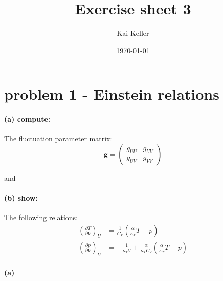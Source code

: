 \documentclass[a4paper]{article}
\title{Exercise sheet 3}
\author{Kai Keller}
\date{\today}
\newcommand{\pd}[3]{\left(\frac{\partial {#1}}{\partial {#2}}\right)_{#3}}
\begin{document}
\maketitle
\tableofcontents

\section{problem 1 - Einstein relations}
\paragraph{(a) compute:}
The fluctuation parameter matrix:
\begin{equation}
    \mathbf{g}=
    \begin{pmatrix}
        g_{UU} & g_{UV} \\
        g_{UV} & g_{VV}
    \end{pmatrix}
\end{equation}

and
\paragraph{(b) show:}
The following relations:
\begin{align}
    \pd{T}{V}{U}&=\frac{1}{C_V}\left( \frac{\alpha}{\kappa_T}T-p  \right) \\
    \pd{p}{V}{U}&=-\frac{1}{\kappa_TV}+\frac{\alpha}{\kappa_TC_V}\left( \frac{\alpha}{\kappa_T}T-p  \right)
    \label{second}
\end{align}

\paragraph{(a)}
\end{document}
